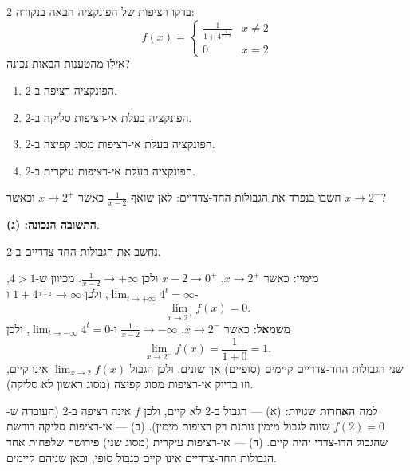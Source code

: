 
\begin{question}
בדקו רציפות של הפונקציה הבאה בנקודה 2:
\[
f(x)=\begin{cases}
\frac{1}{1+4^{\frac{1}{x-2}}} & x\neq 2\\
0 & x=2
\end{cases}
\]
אילו מהטענות הבאות נכונה?
\begin{enumerate}
  \item הפונקציה רציפה ב-2.
  \item הפונקציה בעלת אי-רציפות סליקה ב-2.
  \item הפונקציה בעלת אי-רציפות מסוג קפיצה ב-2.
  \item הפונקציה בעלת אי-רציפות עיקרית ב-2.
\end{enumerate}
\end{question}

\begin{hint}
חשבו בנפרד את הגבולות החד-צדדיים: לאן שואף $\frac{1}{x-2}$ כאשר $x\to2^+$ וכאשר $x\to2^-$?
\end{hint}

\begin{solution}
\textbf{התשובה הנכונה: (ג)}.

נחשב את הגבולות החד-צדדיים ב-2.

\textbf{מימין:} כאשר $x\to2^+$, $x-2\to0^+$ ולכן $\frac1{x-2}\to+\infty$. מכיוון ש-$4>1$, $\lim_{t\to+\infty}4^t=\infty$, ולכן $1+4^{\frac{1}{x-2}}\to\infty$ ו-
\[
\lim_{x\to2^+}f(x)=0 .
\]
\textbf{משמאל:} כאשר $x\to2^-$, $\frac1{x-2}\to-\infty$ ו-$\lim_{t\to-\infty}4^t=0$, ולכן
\[
\lim_{x\to2^-}f(x)=\frac{1}{1+0}=1 .
\]
שני הגבולות החד-צדדיים קיימים (סופיים) אך שונים, ולכן הגבול $\lim_{x\to2}f(x)$ אינו קיים, וזו בדיוק אי-רציפות מסוג קפיצה (מסוג ראשון לא סליקה).

\textbf{למה האחרות שגויות:} (א) — הגבול ב-2 לא קיים, ולכן $f$ אינה רציפה ב-2 (העובדה ש-$f(2)=0$ שווה לגבול מימין נותנת רק רציפות מימין). (ב) — אי-רציפות סליקה דורשת שהגבול הדו-צדדי יהיה קיים. (ד) — אי-רציפות עיקרית (מסוג שני) פירושה שלפחות אחד הגבולות החד-צדדיים אינו קיים כגבול סופי, וכאן שניהם קיימים.
\end{solution}
